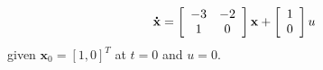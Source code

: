 \[
{\bf{\dot x}} = \left[ {\begin{array}{*{20}c}
   { - 3} & { - 2}  \\
   1 & 0  \\
\end{array}} \right]{\bf{x}} + \left[ {\begin{array}{*{20}c}
   1  \\
   0  \\
\end{array}} \right]u
\]
given $\mathbf{x}_0 = [1, 0]^T$ at $t=0$  and  $u=0$.
\endinput
